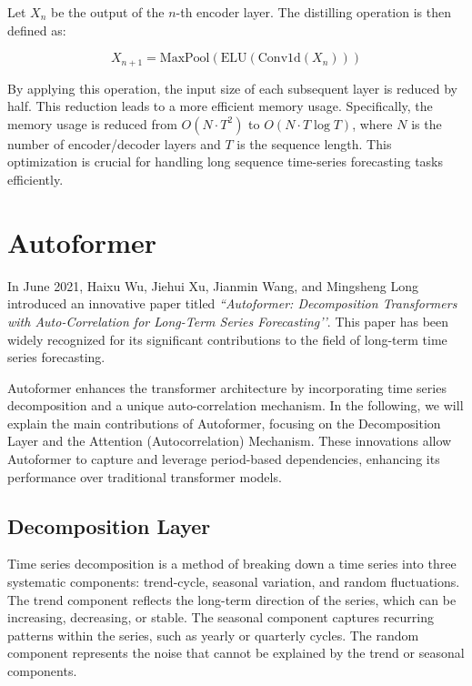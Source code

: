 Let \( X_n \) be the output of the \( n \)-th encoder layer. The distilling operation is then defined as:

\begin{equation}
X_{n+1} = \text{MaxPool}(\text{ELU}(\text{Conv1d}(X_n)))
\end{equation}

By applying this operation, the input size of each subsequent layer is reduced by half. This reduction leads to a more efficient memory usage. Specifically, the memory usage is reduced from \( O(N \cdot T^2) \) to \( O(N \cdot T \log T) \), where \( N \) is the number of encoder/decoder layers and \( T \) is the sequence length. This optimization is crucial for handling long sequence time-series forecasting tasks efficiently.



\section{Autoformer}
In June 2021, Haixu Wu, Jiehui Xu, Jianmin Wang, and Mingsheng Long introduced an innovative paper titled \textit{``Autoformer: Decomposition Transformers with Auto-Correlation for Long-Term Series Forecasting’'}. This paper has been widely recognized for its significant contributions to the field of long-term time series forecasting.

Autoformer enhances the transformer architecture by incorporating time series decomposition and a unique auto-correlation mechanism. In the following, we will explain the main contributions of Autoformer, focusing on the Decomposition Layer and the Attention (Autocorrelation) Mechanism. These innovations allow Autoformer to capture and leverage period-based dependencies, enhancing its performance over traditional transformer models.

\subsection{Decomposition Layer}

Time series decomposition is a method of breaking down a time series into three systematic components: trend-cycle, seasonal variation, and random fluctuations. The trend component reflects the long-term direction of the series, which can be increasing, decreasing, or stable. The seasonal component captures recurring patterns within the series, such as yearly or quarterly cycles. The random component represents the noise that cannot be explained by the trend or seasonal components.

